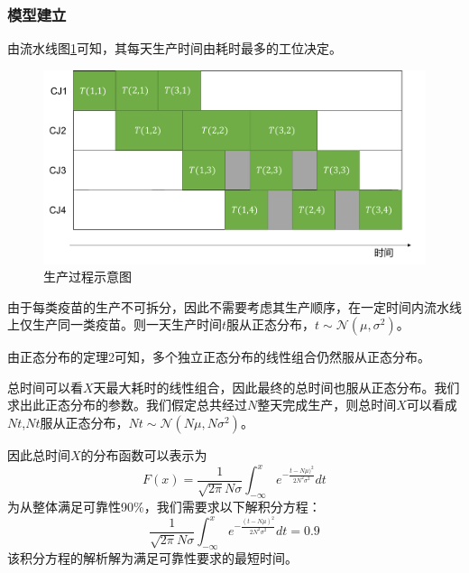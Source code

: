 \documentclass[UTF8]{ctexart}
\begin{document}
	\subsubsection{模型建立}
	由流水线图\ref{pipeline2}可知，其每天生产时间由耗时最多的工位决定。
	\begin{figure}[H]
		\centering %
		\includegraphics[scale=0.5]{pipe2.pdf}
		\caption{生产过程示意图}\label{pipeline2}
	\end{figure}
	由于每类疫苗的生产不可拆分，因此不需要考虑其生产顺序，在一定时间内流水线上仅生产同一类疫苗。则一天生产时间$t$服从正态分布，$t\sim\mathcal{N}(\mu,\sigma^2)$。
	
	由正态分布的定理2可知，多个独立正态分布的线性组合仍然服从正态分布。
	
	总时间可以看$X$天最大耗时的线性组合，因此最终的总时间也服从正态分布。我们求出此正态分布的参数。我们假定总共经过$N$整天完成生产，则总时间$X$可以看成$Nt$,$Nt$服从正态分布，$Nt\sim\mathcal{N}(N\mu,N\sigma^2)$。
	
	因此总时间$X$的分布函数可以表示为
	\begin{equation}
	F(x)=\frac{1}{\sqrt{2\pi}N\sigma}\int^{x}_{-\infty}e^{-\frac{t-N\mu)^2}{2N^2\sigma^2}}dt
	\end{equation}
	为从整体满足可靠性90\%，我们需要求以下解积分方程：
	\begin{equation}
	\frac{1}{\sqrt{2\pi}N\sigma}\int^{x}_{-\infty}e^{-\frac{(t-N\mu)^2}{2N^2\sigma^2}}dt = 0.9
	\end{equation}
	该积分方程的解析解为满足可靠性要求的最短时间。
\end{document}
